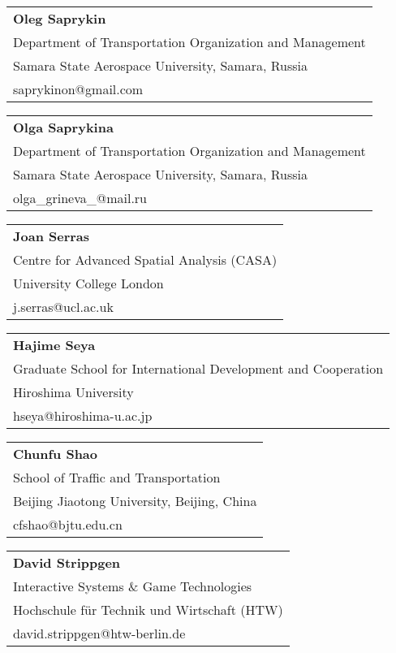 \begin{tabular}[width=0.48\textwidth]{@{}l}
\textbf{Oleg Saprykin} \\
Department of Transportation Organization and Management \\
Samara State Aerospace University, Samara, Russia \\
saprykinon@gmail.com \\
\end{tabular}

\begin{tabular}[width=0.48\textwidth]{@{}l}
\textbf{Olga Saprykina} \\
Department of Transportation Organization and Management \\
Samara State Aerospace University, Samara, Russia \\
olga_grineva_@mail.ru\\
\end{tabular}

\begin{tabular}[width=0.48\textwidth]{@{}l}
\textbf{Joan Serras} \\
Centre for Advanced Spatial Analysis (CASA) \\
University College London \\
j.serras@ucl.ac.uk \\
\end{tabular}

\begin{tabular}[width=0.48\textwidth]{@{}l}
\textbf{Hajime Seya} \\
Graduate School for International Development and Cooperation \\
Hiroshima University \\
hseya@hiroshima-u.ac.jp  \\
\end{tabular}

\begin{tabular}[width=0.48\textwidth]{@{}l}
\textbf{Chunfu Shao} \\
School of Traffic and Transportation \\
Beijing Jiaotong University, Beijing, China \\
cfshao@bjtu.edu.cn \\
\end{tabular}

\begin{tabular}[width=0.48\textwidth]{@{}l}
\textbf{David Strippgen} \\
Interactive Systems \& Game Technologies \\
Hochschule für Technik und Wirtschaft (HTW) \\
david.strippgen@htw-berlin.de \\
\end{tabular}

